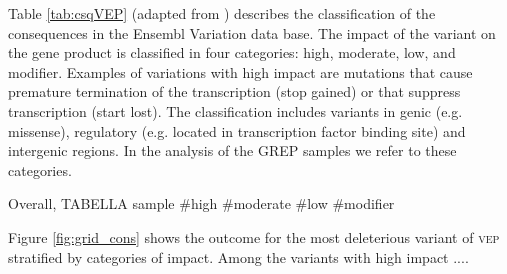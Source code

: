 \documentclass[
tikz,
11pt, %
oneside, %
english, %
singlespacing, %
headsepline, %
]{MastersDoctoralThesisV2} %
\begin{document}

Table \ref{tab:csqVEP} (adapted from \cite{mclaren2016ensembl}) describes the classification of the consequences in the Ensembl Variation data base. The impact of the variant on the gene product is classified in four categories: high, moderate, low, and modifier. Examples of variations with high impact are mutations that cause premature termination of the transcription (stop gained) or that suppress transcription (start lost). The classification includes variants in genic (e.g. missense), regulatory (e.g. located in transcription factor binding site) and intergenic regions. In the analysis of the GREP samples we refer to these categories. 

Overall,  TABELLA sample \#high \#moderate \#low \#modifier 

Figure \ref{fig:grid_cons} shows the outcome for the most deleterious variant of \textsc{vep} stratified by categories of impact. Among the variants with high impact ....

\end{document}
